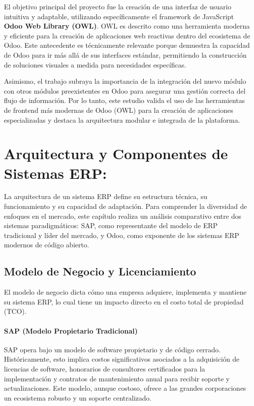 \documentclass[12pt,letterpaper,spanish]{report}
\begin{document}
El objetivo principal del proyecto fue la creación de una interfaz de usuario intuitiva y adaptable, utilizando específicamente el framework de JavaScript \textbf{Odoo Web Library (OWL)}. OWL es descrito como una herramienta moderna y eficiente para la creación de aplicaciones web reactivas dentro del ecosistema de Odoo. Este antecedente es técnicamente relevante porque demuestra la capacidad de Odoo para ir más allá de sus interfaces estándar, permitiendo la construcción de soluciones visuales a medida para necesidades específicas.

Asimismo, el trabajo subraya la importancia de la integración del nuevo módulo con otros módulos preexistentes en Odoo para asegurar una gestión correcta del flujo de información. Por lo tanto, este estudio valida el uso de las herramientas de frontend más modernas de Odoo (OWL) para la creación de aplicaciones especializadas y destaca la arquitectura modular e integrada de la plataforma.




\section{Arquitectura y Componentes de Sistemas ERP:}

La arquitectura de un sistema ERP define su estructura técnica, su funcionamiento y su capacidad de adaptación. Para comprender la diversidad de enfoques en el mercado, este capítulo realiza un análisis comparativo entre dos sistemas paradigmáticos: SAP, como representante del modelo de ERP tradicional y líder del mercado, y Odoo, como exponente de los sistemas ERP modernos de código abierto.

\subsection{Modelo de Negocio y Licenciamiento}


El modelo de negocio dicta cómo una empresa adquiere, implementa y mantiene su sistema ERP, lo cual tiene un impacto directo en el costo total de propiedad (TCO).

\paragraph{SAP (Modelo Propietario Tradicional)}
SAP opera bajo un modelo de software propietario y de código cerrado. Históricamente, esto implica costos significativos asociados a la adquisición de licencias de software, honorarios de consultores certificados para la implementación y contratos de mantenimiento anual para recibir soporte y actualizaciones. Este modelo, aunque costoso, ofrece a las grandes corporaciones un ecosistema robusto y un soporte centralizado.
\end{document}
